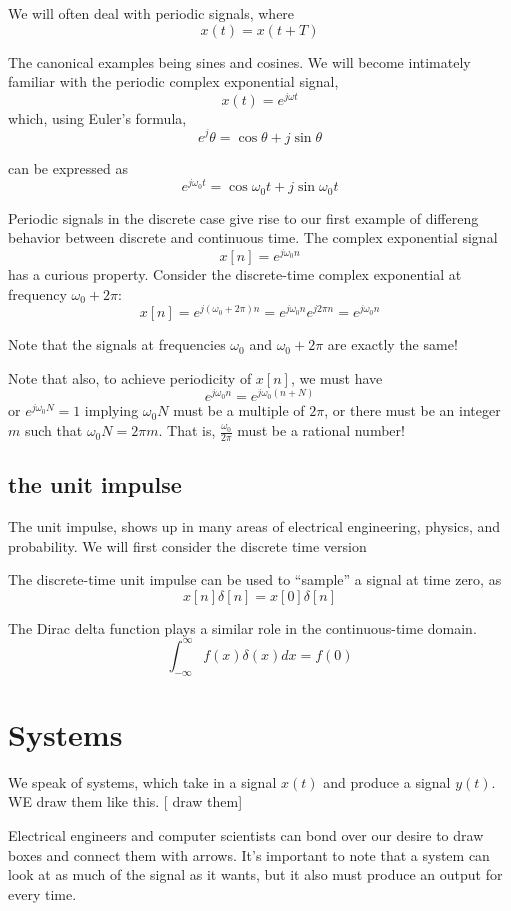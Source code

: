 We will often deal with periodic signals, where
\[
x(t) = x(t+T)
\]

The canonical examples being sines and cosines. We will become intimately 
familiar with the periodic complex exponential signal, 
\[
x(t) = e^{j \omega t}
\]
which, using Euler's formula, 
\[
e^j\theta = \cos \theta + j \sin \theta
\]

can be expressed as 
\[
e^{j \omega_0 t} = \cos \omega_0 t + j \sin \omega_0 t
\]

Periodic signals in the discrete case give rise to our
first example of differeng behavior between discrete and continuous
time. The complex exponential signal
\[
x[n] = e^{j\omega_0 n}
\]
has a curious property. Consider the discrete-time complex exponential
at frequency $\omega_0 + 2\pi$:
\[
x[n] = e^{j(\omega_0 + 2\pi) n} =  e^{j\omega_0 n} e^{j2\pi n} = e^{j\omega_0 n}
\]

Note that the signals at frequencies $\omega_0$ and $\omega_0 + 2\pi$
are exactly the same!

Note that also, to achieve periodicity of $x[n]$, we must have
\[
e^{j\omega_0 n} = e^{j\omega_0 (n + N)}
\]
or $e^{j \omega_0 N} = 1$ implying $\omega_0N $ must be a multiple
of $2\pi$, or there must be an integer $m$ such that $\omega_0 N = 2\pi m$. 
That is, $\frac{\omega_0}{2\pi}$ must be a rational number! 

\subsection{the unit impulse}
The unit impulse, shows up in many areas of electrical
engineering, physics, and probability. We will first consider the 
discrete time version

The discrete-time unit impulse can be used to ``sample'' a signal
at time zero, as
\[
x[n]\delta[n] = x[0]\delta[n]
\]

The Dirac delta function plays a similar role in the continuous-time domain.
\[
\int_{-\infty}^\infty f(x) \delta(x) dx = f(0)
\]

\section{Systems}

We speak of systems, which take in a signal $x(t)$ and produce a
signal $y(t)$. WE draw them like this. [ draw them]

Electrical engineers and computer scientists can bond over our desire
to draw boxes and connect them with arrows. It's important to note that
a system can look at as much of the signal as it wants, but it also
must produce an output for every time. 

